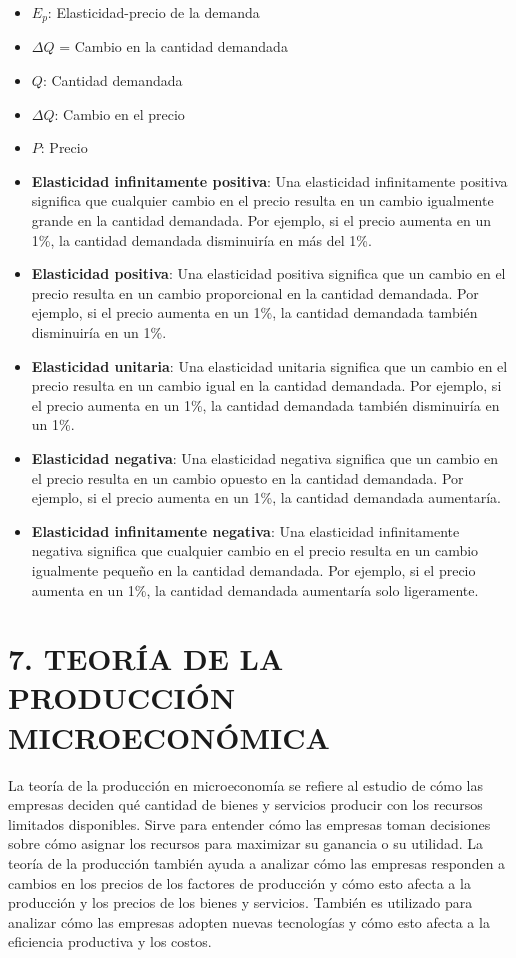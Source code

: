 \documentclass[
  spanish,
  12pt,
]{book}
\begin{document}
\begin{itemize}
\item
  \(E_{p}\): Elasticidad-precio de la demanda
\item
  \(\Delta{Q}\) = Cambio en la cantidad demandada
\item
  \(Q\): Cantidad demandada
\item
  \(\Delta{Q}\): Cambio en el precio
\item
  \(P\): Precio
\item
  \textbf{Elasticidad infinitamente positiva}: Una elasticidad
  infinitamente positiva significa que cualquier cambio en el precio
  resulta en un cambio igualmente grande en la cantidad demandada. Por
  ejemplo, si el precio aumenta en un 1\%, la cantidad demandada
  disminuiría en más del 1\%.
\item
  \textbf{Elasticidad positiva}: Una elasticidad positiva significa que
  un cambio en el precio resulta en un cambio proporcional en la
  cantidad demandada. Por ejemplo, si el precio aumenta en un 1\%, la
  cantidad demandada también disminuiría en un 1\%.
\item
  \textbf{Elasticidad unitaria}: Una elasticidad unitaria significa que
  un cambio en el precio resulta en un cambio igual en la cantidad
  demandada. Por ejemplo, si el precio aumenta en un 1\%, la cantidad
  demandada también disminuiría en un 1\%.
\item
  \textbf{Elasticidad negativa}: Una elasticidad negativa significa que
  un cambio en el precio resulta en un cambio opuesto en la cantidad
  demandada. Por ejemplo, si el precio aumenta en un 1\%, la cantidad
  demandada aumentaría.
\item
  \textbf{Elasticidad infinitamente negativa}: Una elasticidad
  infinitamente negativa significa que cualquier cambio en el precio
  resulta en un cambio igualmente pequeño en la cantidad demandada. Por
  ejemplo, si el precio aumenta en un 1\%, la cantidad demandada
  aumentaría solo ligeramente.
\end{itemize}

\chapter{7. TEORÍA DE LA PRODUCCIÓN
MICROECONÓMICA}\label{teoruxeda-de-la-producciuxf3n-microeconuxf3mica}

La teoría de la producción en microeconomía se refiere al estudio de
cómo las empresas deciden qué cantidad de bienes y servicios producir
con los recursos limitados disponibles. Sirve para entender cómo las
empresas toman decisiones sobre cómo asignar los recursos para maximizar
su ganancia o su utilidad. La teoría de la producción también ayuda a
analizar cómo las empresas responden a cambios en los precios de los
factores de producción y cómo esto afecta a la producción y los precios
de los bienes y servicios. También es utilizado para analizar cómo las
empresas adopten nuevas tecnologías y cómo esto afecta a la eficiencia
productiva y los costos.
\end{document}
